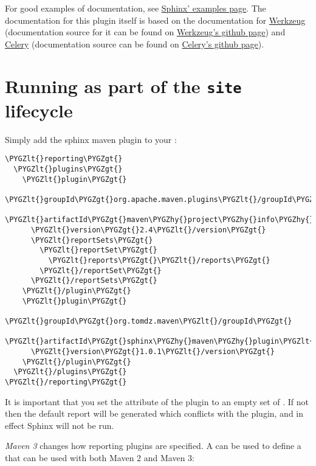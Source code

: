 \documentclass[letterpaper,10pt,english]{sphinxmanual}
\def\PYGZlt{\char`\<}
\def\PYGZgt{\char`\>}
\def\PYGZhy{\char`\-}
\begin{document}
For good examples of documentation, see \href{http://sphinx.pocoo.org/examples.html}{Sphinx' examples page}.  The documentation for this plugin itself is
based on the documentation for \href{http://werkzeug.pocoo.org/docs/}{Werkzeug} (documentation source for it can be found on \href{https://github.com/mitsuhiko/werkzeug/tree/master/docs}{Werkzeug's github page})
and \href{http://docs.celeryproject.org/en/latest/index.html}{Celery} (documentation source can be found on \href{http://docs.celeryproject.org/en/latest/index.html}{Celery's github page}).


\chapter{Running as part of the \texttt{site} lifecycle}
\label{basic-usage:running-as-part-of-the-site-lifecycle}
Simply add the sphinx maven plugin to your :

\begin{Verbatim}[commandchars=\\\{\}]
\PYGZlt{}reporting\PYGZgt{}
  \PYGZlt{}plugins\PYGZgt{}
    \PYGZlt{}plugin\PYGZgt{}
      \PYGZlt{}groupId\PYGZgt{}org.apache.maven.plugins\PYGZlt{}/groupId\PYGZgt{}
      \PYGZlt{}artifactId\PYGZgt{}maven\PYGZhy{}project\PYGZhy{}info\PYGZhy{}reports\PYGZhy{}plugin\PYGZlt{}/artifactId\PYGZgt{}
      \PYGZlt{}version\PYGZgt{}2.4\PYGZlt{}/version\PYGZgt{}
      \PYGZlt{}reportSets\PYGZgt{}
        \PYGZlt{}reportSet\PYGZgt{}
          \PYGZlt{}reports\PYGZgt{}\PYGZlt{}/reports\PYGZgt{}
        \PYGZlt{}/reportSet\PYGZgt{}
      \PYGZlt{}/reportSets\PYGZgt{}
    \PYGZlt{}/plugin\PYGZgt{}
    \PYGZlt{}plugin\PYGZgt{}
      \PYGZlt{}groupId\PYGZgt{}org.tomdz.maven\PYGZlt{}/groupId\PYGZgt{}
      \PYGZlt{}artifactId\PYGZgt{}sphinx\PYGZhy{}maven\PYGZhy{}plugin\PYGZlt{}/artifactId\PYGZgt{}
      \PYGZlt{}version\PYGZgt{}1.0.1\PYGZlt{}/version\PYGZgt{}
    \PYGZlt{}/plugin\PYGZgt{}
  \PYGZlt{}/plugins\PYGZgt{}
\PYGZlt{}/reporting\PYGZgt{}
\end{Verbatim}

It is important that you set the  attribute of the  plugin to an empty set of
. If not then the default  report will be generated which conflicts with the 
plugin, and in effect Sphinx will not be run.

\emph{Maven 3} changes how reporting plugins are specified. A  can be used to define a  that can
be used with both Maven 2 and Maven 3:
\end{document}
